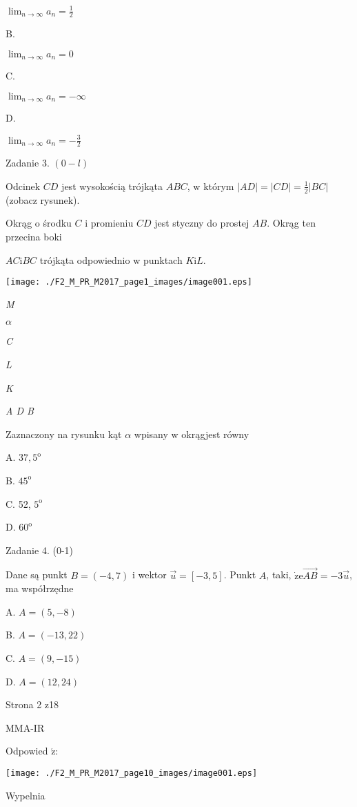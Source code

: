\documentclass[a4paper,12pt]{article}
\begin{document}
$\displaystyle \lim_{n\rightarrow\infty}a_{n}=\frac{1}{2}$

B.

$\displaystyle \lim_{n\rightarrow\infty}a_{n}=0$

C.

$\displaystyle \lim_{n\rightarrow\infty}a_{n}=-\infty$

D.

$\displaystyle \lim_{n\rightarrow\infty}a_{n}=-\frac{3}{2}$

Zadanie 3. $(0-l)$

Odcinek $CD$ jest wysokością trójkąta $ABC$, w którym $|AD|=|CD|=\displaystyle \frac{1}{2}|BC|$ (zobacz rysunek).

Okrąg o środku $C$ i promieniu $CD$ jest styczny do prostej $AB$. Okrąg ten przecina boki

$AC\mathrm{i}BC$ trójkąta odpowiednio w punktach $K\mathrm{i}L.$
\begin{center}
\texttt{[image: ./F2\_M\_PR\_M2017\_page1\_images/image001.eps]}
\end{center}
{\it M}

$\alpha$

{\it C}

{\it L}

{\it K}

{\it A  D  B}

Zaznaczony na rysunku kąt $\alpha$ wpisany w okrągjest równy

A. $37,5^{\mathrm{o}}$

B. $45^{\mathrm{o}}$

C. 52, $5^{\mathrm{o}}$

D. $60^{\mathrm{o}}$

Zadanie 4. (0-1)

Dane są punkt $B=(-4,7)$ i wektor $\vec{u}=[-3,5]$. Punkt $A$, taki, $\dot{\mathrm{z}}\mathrm{e}\vec{AB}=-3\vec{u}$, ma współrzędne

A. $A=(5,-8)$

B. $A=(-13,22)$

C. $A=(9,-15)$

D. $A=(12,24)$

Strona 2 z18

MMA-IR





Odpowied $\acute{\mathrm{z}}$:
\begin{center}
\texttt{[image: ./F2\_M\_PR\_M2017\_page10\_images/image001.eps]}
\end{center}
Wypelnia
\end{document}
